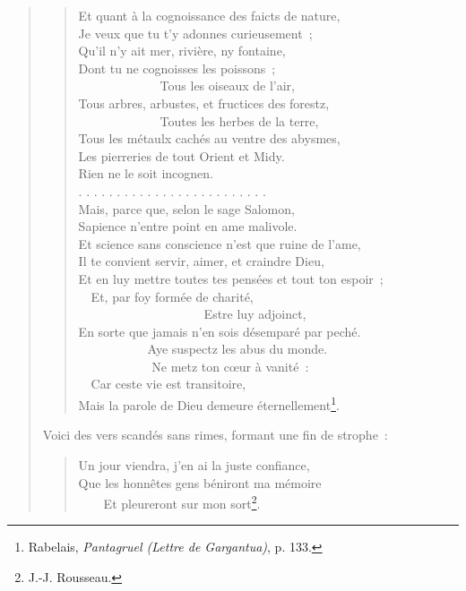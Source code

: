\documentclass[french,twoside]{book} %
\begin{document}
\begin{verse}
\begin{verse}
Et quant à la cognoissance des faicts de nature,\\
Je veux que tu t’y adonnes curieusement ;\\
Qu’il n’y ait mer, rivière, ny fontaine,\\
Dont tu ne cognoisses les poissons ;\\
             Tous les oiseaux de l’air,\\
Tous arbres, arbustes, et fructices des forestz,\\
             Toutes les herbes de la terre,\\
Tous les métaulx cachés au ventre des abysmes,\\
Les pierreries de tout Orient et Midy.\\
Rien ne le soit incognen.\\
. . . . . . . . . . . . . . . . . . . . . . . . .\\
Mais, parce que, selon le sage Salomon,\\
Sapience n’entre point en ame malivole.\\
Et science sans conscience n’est que ruine de l’ame,\\
Il te convient servir, aimer, et craindre Dieu,\\
Et en luy mettre toutes tes pensées et tout ton espoir ;\\
  Et, par foy formée de charité,\\
                    Estre luy adjoinct,\\
En sorte que jamais n’en sois désemparé par peché.\\
           Aye suspectz les abus du monde.\\
            Ne metz ton cœur à vanité :\\
  Car ceste vie est transitoire,\\
Mais la parole de Dieu demeure éternellement\footnote{ Rabelais, \emph{Pantagruel (Lettre de Gargantua)}, p. 133.}.\\
\end{verse}

\noindent Voici des vers scandés sans rimes, formant une fin de strophe :\par


\begin{verse}
Un jour viendra, j’en ai la juste confiance,\\
Que les honnêtes gens béniront ma mémoire\\
    Et pleureront sur mon sort\footnote{J.-J. Rousseau.}.\\
\end{verse}


\end{verse}
\end{document}
